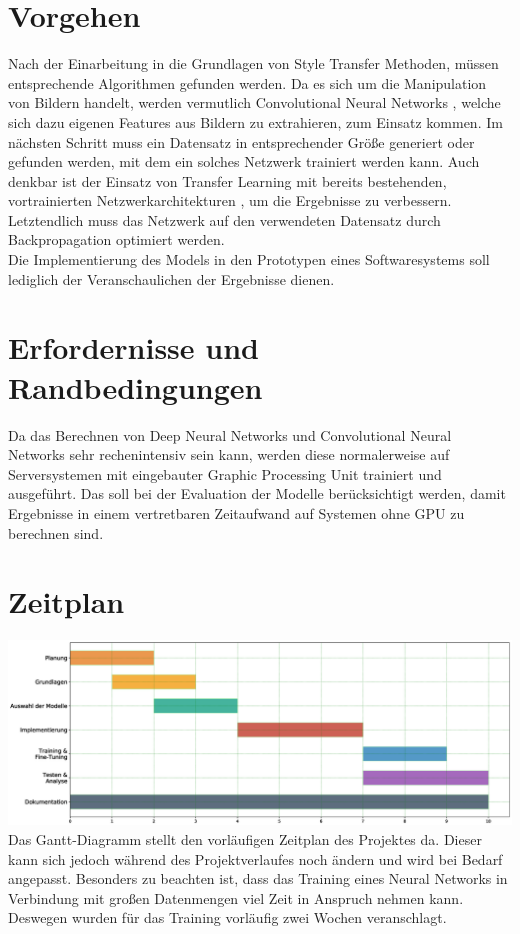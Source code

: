 \section{Vorgehen}
Nach der Einarbeitung in die Grundlagen von Style Transfer \cite{DBLP:journals/corr/GatysEB15a} Methoden, müssen entsprechende Algorithmen gefunden werden.
Da es sich um die Manipulation von Bildern handelt, werden vermutlich Convolutional Neural Networks \cite{lecun-gradientbased-learning-applied-1998}, 
welche sich dazu eigenen Features aus Bildern zu extrahieren, zum Einsatz kommen.
Im nächsten Schritt muss ein Datensatz in entsprechender Größe generiert oder gefunden werden, mit dem ein solches Netzwerk trainiert werden
kann. Auch denkbar ist der Einsatz von Transfer Learning mit bereits bestehenden, 
vortrainierten Netzwerkarchitekturen \cite{DBLP:journals/corr/SimonyanZ14a}, um die Ergebnisse zu verbessern.
Letztendlich muss das Netzwerk auf den verwendeten Datensatz durch Backpropagation \cite{doi:10.1162/neco.1989.1.4.541} optimiert werden.
\\
Die Implementierung des Models in den Prototypen eines Softwaresystems soll lediglich der Veranschaulichen der Ergebnisse dienen.

\pagebreak

\section{Erfordernisse und Randbedingungen}
Da das Berechnen von Deep Neural Networks und Convolutional Neural Networks sehr rechenintensiv sein kann,
werden diese normalerweise auf Serversystemen mit eingebauter Graphic Processing Unit trainiert und ausgeführt. Das soll bei der Evaluation der 
Modelle berücksichtigt werden, damit Ergebnisse in einem vertretbaren Zeitaufwand auf Systemen ohne GPU zu berechnen sind.

\section{Zeitplan}
\includegraphics[width=1.00\textwidth]{resources/gantt.eps}
Das Gantt-Diagramm stellt den vorläufigen Zeitplan des Projektes da.
Dieser kann sich jedoch während des Projektverlaufes noch ändern und wird bei Bedarf angepasst.
Besonders zu beachten ist, dass das Training eines Neural Networks in Verbindung mit großen Datenmengen viel Zeit in Anspruch nehmen kann.
Deswegen wurden für das Training vorläufig zwei Wochen veranschlagt.

